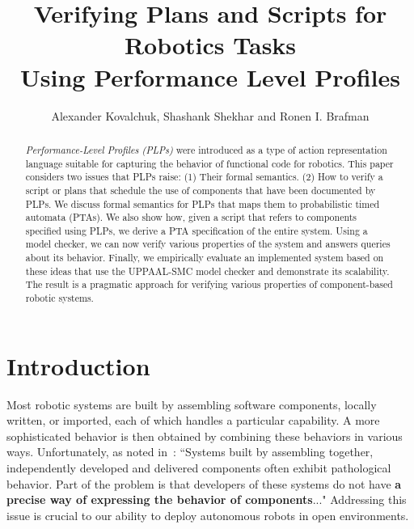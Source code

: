 \documentclass[letterpaper]{article}
\title{Verifying Plans and Scripts for Robotics Tasks \\ Using Performance Level Profiles}
\author{
    Alexander Kovalchuk, Shashank Shekhar {\normalfont and} Ronen I. Brafman \\
}
\begin{document}
\maketitle




\begin{abstract}
{\em Performance-Level Profiles (PLPs)\/} were introduced as a
type of action representation language suitable for capturing the behavior of functional code for robotics. This paper considers two issues that PLPs raise: (1) Their formal semantics. (2) How to verify a script or plans that schedule the use of components that have been documented by PLPs. We discuss formal semantics for PLPs that maps them to probabilistic timed automata (PTAs). We also show how, given a script that refers to components specified using PLPs, we derive a PTA specification of the entire system. Using a model checker, we can now verify various properties of the system and answers queries about its behavior. Finally, we empirically evaluate an implemented system based on these ideas that use the UPPAAL-SMC model checker
and demonstrate its scalability. The result is a pragmatic approach for verifying various properties of component-based robotic systems.
\end{abstract}




\section{Introduction}
Most robotic systems are built by assembling software components, locally written, or imported, each of which handles a particular capability. A more sophisticated behavior is then obtained by combining these behaviors in various ways.
Unfortunately, as noted in~\citet{Abdellatif12}: ``Systems built by assembling together, independently developed and delivered components often exhibit pathological behavior. Part of the problem is that developers of these systems do not have {\bf a precise way of expressing the behavior of components}..."
Addressing this issue is crucial to our ability to deploy autonomous robots in open environments. 

\end{document}
